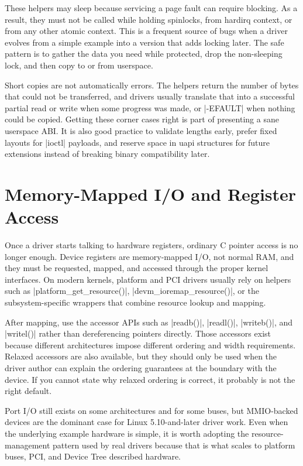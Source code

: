\documentclass[10pt, oneside]{book}
\begin{document}
These helpers may sleep because servicing a page fault can require blocking.
As a result, they must not be called while holding spinlocks, from hardirq
context, or from any other atomic context.
This is a frequent source of bugs when a driver evolves from a simple example
into a version that adds locking later.
The safe pattern is to gather the data you need while protected, drop the
non-sleeping lock, and then copy to or from userspace.

Short copies are not automatically errors.
The helpers return the number of bytes that could not be transferred, and
drivers usually translate that into a successful partial read or write when some
progress was made, or \cpp|-EFAULT| when nothing could be copied.
Getting these corner cases right is part of presenting a sane userspace ABI.
It is also good practice to validate lengths early, prefer fixed layouts for
\cpp|ioctl| payloads, and reserve space in uapi structures for future
extensions instead of breaking binary compatibility later.

\section{Memory-Mapped I/O and Register Access}
\label{sec:mmio}
Once a driver starts talking to hardware registers, ordinary C pointer access is
no longer enough.
Device registers are memory-mapped I/O, not normal RAM, and they must be
requested, mapped, and accessed through the proper kernel interfaces.
On modern kernels, platform and PCI drivers usually rely on helpers such as
\cpp|platform_get_resource()|, \cpp|devm_ioremap_resource()|, or the
subsystem-specific wrappers that combine resource lookup and mapping.

After mapping, use the accessor APIs such as \cpp|readb()|, \cpp|readl()|,
\cpp|writeb()|, and \cpp|writel()| rather than dereferencing pointers directly.
Those accessors exist because different architectures impose different ordering
and width requirements.
Relaxed accessors are also available, but they should only be used when the
driver author can explain the ordering guarantees at the boundary with the
device.
If you cannot state why relaxed ordering is correct, it probably is not the
right default.

Port I/O still exists on some architectures and for some buses, but MMIO-backed
devices are the dominant case for Linux 5.10-and-later driver work.
Even when the underlying example hardware is simple, it is worth adopting the
resource-management pattern used by real drivers because that is what scales to
platform buses, PCI, and Device Tree described hardware.
\end{document}
